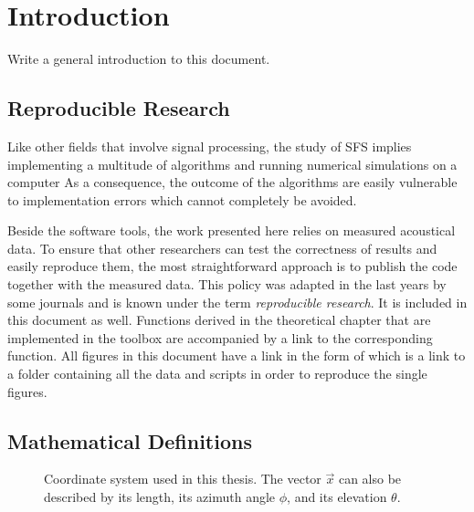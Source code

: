 \def \GITHUB {\GITHUBBASE/01_introduction}
\graphicspath{%
{\PATH/\CHAPONE/}%
{\PATH/\CHAPONE/fig1_01/}%
}

\chapter{Introduction}
\label{cha:introduction}
%
Write a general introduction to this document.
%
\section{Reproducible Research}
\label{sec:reproducible_research}
%
Like other fields that involve signal processing, the study of \ac{SFS}
implies implementing a multitude of algorithms and running numerical simulations
on a computer
As a consequence, the outcome of the algorithms are easily vulnerable to
implementation errors which cannot completely be
avoided.

Beside the software tools, the work presented here relies on measured acoustical
data.
To ensure that other
researchers can test the correctness of results and easily reproduce them,
the most straightforward approach is to publish the code together with the
measured data.
This policy was adapted in the last years by some journals and is known under the
term \emph{reproducible research}.
It is included in this document as well.
Functions derived in the theoretical chapter that are implemented in the
toolbox are accompanied by a link to the corresponding function. All figures in
this document have a link in the form of \reproduce{\GITHUBBASE} which is a link to a
folder containing all the data and scripts in order to reproduce the single
figures.


\section{Mathematical Definitions}
\label{sec:mathematical_definitions}
%
\begin{figure}
    \centering
    \small
    
    \caption{Coordinate system used in this thesis. The vector $\vec{x}$ can also
    be described by its length, its azimuth angle $\phi$, and its elevation
    $\theta$.
    \reproduce{\GITHUB/fig1_01}}
    \label{fig:coordinate_system}
\end{figure}
%
